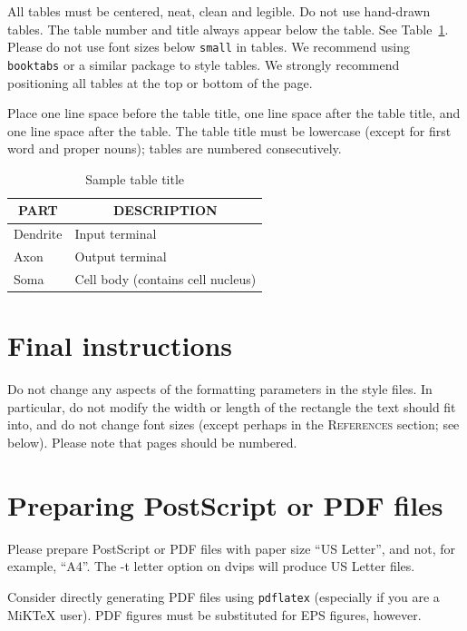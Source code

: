 \documentclass{article} %
\begin{document}
All tables must be centered, neat, clean and legible. Do not use hand-drawn tables. The table number and title always appear below the table. See Table~\ref{sample-table}. Please do not use font sizes below {\tt small} in tables. We recommend using {\tt booktabs} or a similar package to style tables.
We strongly recommend positioning all tables at the top or bottom of the page.

Place one line space before the table title, one line space after the table title, and one line space after the table. The table title must be lowercase (except for first word and proper nouns); tables are numbered consecutively.

\begin{table}[t]
\begin{center}
\begin{tabular}{ll}
\toprule
\multicolumn{1}{c}{\bf PART}  &\multicolumn{1}{c}{\bf DESCRIPTION} \\
\midrule
Dendrite         &Input terminal \\
Axon             &Output terminal \\
Soma             &Cell body (contains cell nucleus) \\
\bottomrule
\end{tabular}
\end{center}
\caption{Sample table title}\label{sample-table}
\end{table}




\section{Final instructions}
Do not change any aspects of the formatting parameters in the style files.
In particular, do not modify the width or length of the rectangle the text
should fit into, and do not change font sizes (except perhaps in the
\textsc{References} section; see below). Please note that pages should be
numbered.

\section{Preparing PostScript or PDF files}

Please prepare PostScript or PDF files with paper size ``US Letter'', and
not, for example, ``A4''. The -t
letter option on dvips will produce US Letter files.

Consider directly generating PDF files using \verb+pdflatex+
(especially if you are a MiKTeX user).
PDF figures must be substituted for EPS figures, however.
\end{document}
